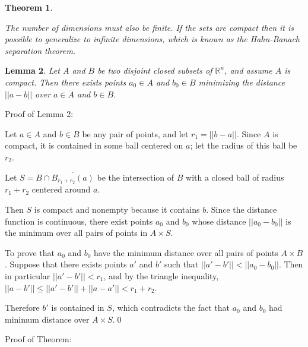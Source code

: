 \documentclass[11pt]{amsart}
\newtheorem{thm}{Theorem}%
\newtheorem{lem}[thm]{Lemma}
\theoremstyle{remark}
\theoremstyle{definition}
\begin{document}
\begin{thm}
\begin{mdframed}
        The number of dimensions must also be finite. If the sets are compact
        then it is possible to generalize to infinite dimensions, which is known
        as the Hahn-Banach separation theorem.
    \end{mdframed}
\end{thm}

\begin{lem}
    Let $A$ and $B$ be two disjoint closed subsets of $\mathbb{R}^n$,
    and assume $A$ is compact. Then there exists points $a_0 \in A$
    and $b_0 \in B$ minimizing the distance $||a - b||$ over
    $a \in A$ and $b \in B$.
\end{lem}

Proof of Lemma 2:
\vspace{8pt}
\begin{mdframed}
    Let $a \in A$ and $b \in B$ be any pair of points, and let
    $r_1 = ||b - a||$. Since $A$ is compact, it is contained
    in some ball centered on $a$; let the radius of this ball
    be $r_2$.

    Let $S = B \cap \overline{B_{r_1 + r_2}(a)}$ be the intersection
    of $B$ with a closed ball of radius $r_1 + r_2$ centered around
    $a$.

    Then $S$ is compact and nonempty because it contains $b$. Since
    the distance function is continuous, there exist points
    $a_0$ and $b_0$ whose distance $||a_0 - b_0||$ is the minimum
    over all pairs of points in $A \times S$.

    To prove that $a_0$ and $b_0$ have the minimum distance over all
    pairs of points $A \times B$. Suppose that there exists points
    $a'$ and $b'$ such that $||a' - b'|| < ||a_0 - b_0||$. Then in
    particular $||a' - b'|| < r_1$, and by the triangle inequality,
    $||a - b'|| \le ||a' - b'|| + ||a - a'|| < r_1 + r_2$. 

    Therefore $b'$ is contained in $S$, which contradicts the
    fact that $a_0$ and $b_0$ had minimum distance over $A \times S$.\qed
\end{mdframed}

\pagebreak
Proof of Theorem:
\end{document}
